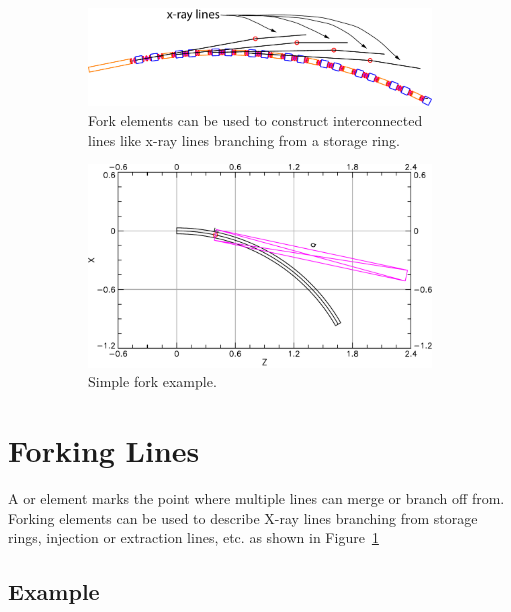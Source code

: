 \documentclass{hitec}
\newcommand{\Section}[1]{\section{#1}\vspace*{-1ex}}
\begin{document}
\begin{figure}[tb]
  \centering
  \begin{subfigure}[b]{0.48\textwidth}
    \includegraphics[width=\textwidth]{x-fork.pdf}
    \caption{Fork elements can be used to construct interconnected lines like x-ray lines branching
      from a storage ring.}
    \label{f:fork}
  \end{subfigure}
  \hfil
  \begin{subfigure}[b]{0.48\textwidth}
    \includegraphics[width=\textwidth]{fork-example.pdf}
    \caption{Simple fork example.}
    \label{f:fork.example}
  \end{subfigure}
  \caption{}
\end{figure}

\Section{Forking Lines}

A  or  element marks the point where multiple lines can merge or branch off from.
Forking elements can be used to describe X-ray lines branching from storage rings, injection or
extraction lines, etc. as shown in Figure~\ref{f:fork}

\subsection{Example}
\end{document}
